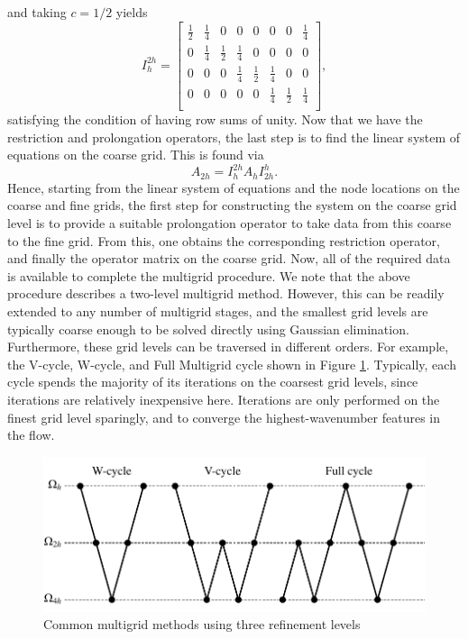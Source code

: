 and taking $c = 1/2$ yields
\begin{equation}
	I_{h}^{2h} =
	\begin{bmatrix}
	    \frac{1}{2} & \frac{1}{4} & 0 & 0 & 0 & 0 & 0 & \frac{1}{4} \\
			0 & \frac{1}{4} & \frac{1}{2} & \frac{1}{4} & 0 & 0 & 0 & 0 \\
			0 & 0 & 0 & \frac{1}{4} & \frac{1}{2} & \frac{1}{4} & 0 & 0 \\
			0 & 0 & 0 & 0 & 0 & \frac{1}{4} & \frac{1}{2} & \frac{1}{4} \\
	\end{bmatrix},
\end{equation}
satisfying the condition of having row sums of unity. Now that we have the restriction and prolongation operators, the last step is to find the linear system of equations on the coarse grid. This is found via
\begin{equation}
	A_{2h} = I_{h}^{2h} A_h I_{2h}^{h}.
\end{equation}
Hence, starting from the linear system of equations and the node locations on the coarse and fine grids, the first step for constructing the system on the coarse grid level is to provide a suitable prolongation operator to take data from this coarse to the fine grid. From this, one obtains the corresponding restriction operator, and finally the operator matrix on the coarse grid. Now, all of the required data is available to complete the multigrid procedure. We note that the above procedure describes a two-level multigrid method. However, this can be readily extended to any number of multigrid stages, and the smallest grid levels are typically coarse enough to be solved directly using Gaussian elimination. Furthermore, these grid levels can be traversed in different orders. For example, the V-cycle, W-cycle, and Full Multigrid cycle shown in Figure \ref{fig:multigrid}. Typically, each cycle spends the majority of its iterations on the coarsest grid levels, since iterations are relatively inexpensive here. Iterations are only performed on the finest grid level sparingly, and to converge the highest-wavenumber features in the flow.
\begin{figure}[htbp]
	\centering
	\includegraphics[width=0.8\linewidth]{Pictures/multigrid}
	\caption{Common multigrid methods using three refinement levels}
	\label{fig:multigrid}
\end{figure}

